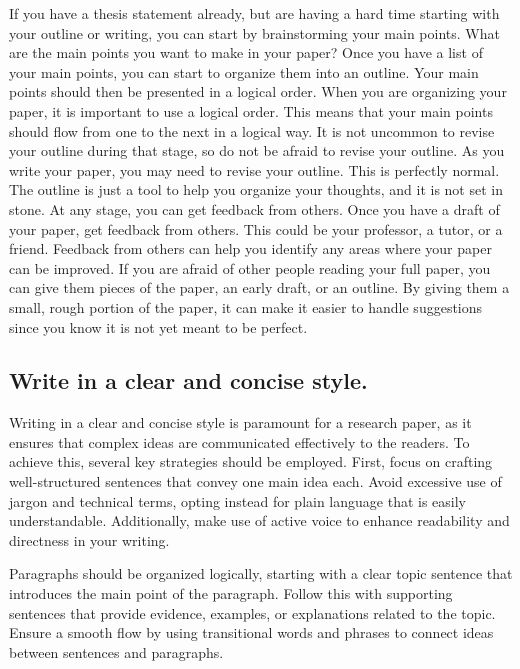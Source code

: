 \documentclass[
  b5paper]{book}
\begin{document}
If you have a thesis statement already, but are having a hard time starting with your outline or writing, you can start by brainstorming your main points. What are the main points you want to make in your paper? Once you have a list of your main points, you can start to organize them into an outline. Your main points should then be presented in a logical order. When you are organizing your paper, it is important to use a logical order. This means that your main points should flow from one to the next in a logical way. It is not uncommon to revise your outline during that stage, so do not be afraid to revise your outline. As you write your paper, you may need to revise your outline. This is perfectly normal. The outline is just a tool to help you organize your thoughts, and it is not set in stone. At any stage, you can get feedback from others. Once you have a draft of your paper, get feedback from others. This could be your professor, a tutor, or a friend. Feedback from others can help you identify any areas where your paper can be improved. If you are afraid of other people reading your full paper, you can give them pieces of the paper, an early draft, or an outline. By giving them a small, rough portion of the paper, it can make it easier to handle suggestions since you know it is not yet meant to be perfect.

\hypertarget{write-in-a-clear-and-concise-style.}{%
\subsection*{Write in a clear and concise style.}\label{write-in-a-clear-and-concise-style.}}

Writing in a clear and concise style is paramount for a research paper, as it ensures that complex ideas are communicated effectively to the readers. To achieve this, several key strategies should be employed. First, focus on crafting well-structured sentences that convey one main idea each. Avoid excessive use of jargon and technical terms, opting instead for plain language that is easily understandable. Additionally, make use of active voice to enhance readability and directness in your writing.

Paragraphs should be organized logically, starting with a clear topic sentence that introduces the main point of the paragraph. Follow this with supporting sentences that provide evidence, examples, or explanations related to the topic. Ensure a smooth flow by using transitional words and phrases to connect ideas between sentences and paragraphs.
\end{document}
